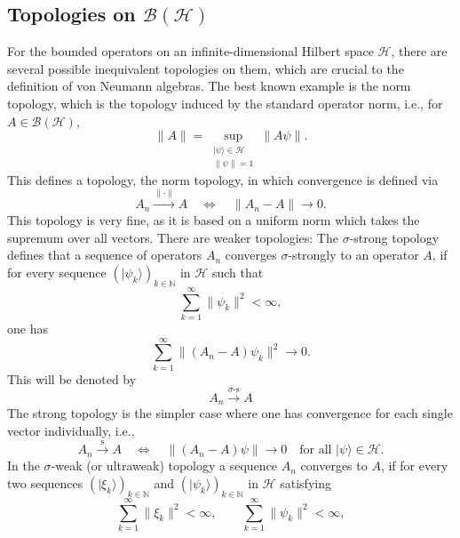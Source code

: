 \documentclass[aps,pra,reprint,superscriptaddress]{revtex4-2}
\newcommand{\cB}{{\mathcal B}}
\newcommand{\cH}{{\mathcal H}}
\newcommand\s{\sigma}
\newcommand\x{\xi}
\newcommand\y{\psi}
\providecommand{\ket}[1]{\lvert #1\rangle}
\providecommand{\norm}[1]{\lVert #1\rVert}
\theoremstyle{definition}
\theoremstyle{remark}
\begin{document}
    \subsection{Topologies on $\cB(\cH)$}
    For the bounded operators on an infinite-dimensional Hilbert space $\cH$,
    there are several possible inequivalent topologies on them, which are
    crucial to the definition of von Neumann algebras. The best known example
    is the norm topology, which is the topology induced by the standard
    operator norm, i.e., for $A \in \cB(\cH)$,
    \begin{equation}
        \norm{A} = \sup_{\substack{\ket{\y}\in\cH\\\norm{\y}=1}} \norm{A\y}.
    \end{equation}
    This defines a topology, the norm topology, in which convergence is defined
    via
    \begin{equation}
        A_n \xrightarrow{\norm{\cdot}} A
        \quad\Longleftrightarrow\quad
        \norm{A_n-A}\to 0.
    \end{equation}
    This topology is very fine, as it is based on a uniform norm which takes
    the supremum over all vectors. There are weaker topologies: The
    $\sigma$-strong topology defines that a sequence of operators
    $A_n$ converges $\s$-strongly to an operator $A$, if for every sequence $(\ket{\y_k})_{k\in\mathbb{N}}$ in $\cH$ such that
    \begin{equation}
        \sum_{k=1}^{\infty}\norm{\y_k}^2<\infty,
    \end{equation}
    one has
    \begin{equation}
        \sum_{k=1}^{\infty}\norm{(A_n-A)\y_k}^2\to 0.
    \end{equation}
    This will be denoted by 
    \begin{equation}
        A_n \xrightarrow{\sigma\text{-}\mathrm{s}} A
    \end{equation}
    The strong topology is the simpler case where one has convergence for
    each single vector individually, i.e.,
    \begin{equation}
        A_n \xrightarrow{\mathrm{s}} A
        \quad\Longleftrightarrow\quad
        \norm{(A_n-A)\y}\to 0
        \quad\text{for all }\ket{\y}\in\cH.
    \end{equation}
    In the $\sigma$-weak (or ultraweak) topology a sequence $A_n$ converges to $A$, if for every two sequences $(\ket{\x_k})_{k\in\mathbb{N}}$ and $(\ket{\y_k})_{k\in\mathbb{N}}$ in $\cH$ satisfying
    \begin{equation}
        \sum_{k=1}^{\infty}\norm{\x_k}^2<\infty,
        \qquad
        \sum_{k=1}^{\infty}\norm{\y_k}^2<\infty,
    \end{equation}
\end{document}
